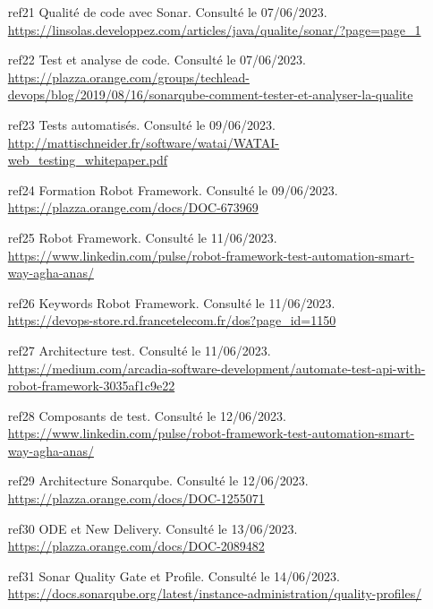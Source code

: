 \begin{enumerate}
\item[ref21] Qualité de code avec Sonar. Consulté le 07/06/2023.\\
\url{https://linsolas.developpez.com/articles/java/qualite/sonar/?page=page_1}

\item[ref22] Test et analyse de code. Consulté le 07/06/2023.\\
\url{https://plazza.orange.com/groups/techlead-devops/blog/2019/08/16/sonarqube-comment-tester-et-analyser-la-qualite}

\item[ref23] Tests automatisés. Consulté le 09/06/2023.\\
\url{http://mattischneider.fr/software/watai/WATAI-web_testing_whitepaper.pdf}

\item[ref24] Formation Robot Framework. Consulté le 09/06/2023.\\
\url{https://plazza.orange.com/docs/DOC-673969}

\item[ref25] Robot Framework. Consulté le 11/06/2023.\\
\url{https://www.linkedin.com/pulse/robot-framework-test-automation-smart-way-agha-anas/}

\item[ref26] Keywords Robot Framework. Consulté le 11/06/2023.\\
\url{https://devops-store.rd.francetelecom.fr/dos?page_id=1150}

\item[ref27] Architecture test. Consulté le 11/06/2023.\\
\url{https://medium.com/arcadia-software-development/automate-test-api-with-robot-framework-3035af1c9e22}

\item[ref28] Composants de test. Consulté le 12/06/2023.\\
\url{https://www.linkedin.com/pulse/robot-framework-test-automation-smart-way-agha-anas/}

\item[ref29] Architecture Sonarqube. Consulté le 12/06/2023.\\
\url{https://plazza.orange.com/docs/DOC-1255071}

\item[ref30] ODE et New Delivery. Consulté le 13/06/2023.\\
\url{https://plazza.orange.com/docs/DOC-2089482}

\item[ref31] Sonar Quality Gate et Profile. Consulté le 14/06/2023.\\
\url{https://docs.sonarqube.org/latest/instance-administration/quality-profiles/}


\end{enumerate}
